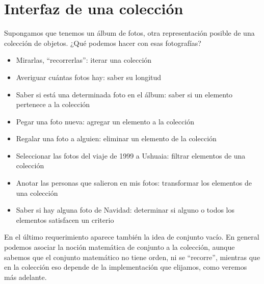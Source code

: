 \documentclass[a4paper,12pt]{book}
\begin{document}
\section{Interfaz de una colección}
Supongamos que tenemos un álbum de fotos, otra representación posible de una colección de objetos.
¿Qué podemos hacer con esas fotografías?
\\
\begin{itemize}
\item Mirarlas, ``recorrerlas'': iterar una colección
\item Averiguar cuántas fotos hay: saber su longitud
\item Saber si está una determinada foto en el álbum: saber si un elemento pertenece a la colección
\item Pegar una foto nueva: agregar un elemento a la colección
\item Regalar una foto a alguien: eliminar un elemento de la colección
\item Seleccionar las fotos del viaje de 1999 a Ushuaia: filtrar elementos de una colección
\item Anotar las personas que salieron en mis fotos: transformar los elementos de una colección
\item Saber si hay alguna foto de Navidad: determinar si alguno o todos los elementos satisfacen 
un criterio
\end{itemize}
En el último requerimiento aparece también la idea de conjunto vacío. 
En general podemos asociar la noción matemática de conjunto a la colección, aunque sabemos que el conjunto
matemático no tiene orden, ni se ``recorre'', mientras que en la colección eso depende de la implementación 
que elijamos, como veremos más adelante.
\\
\end{document}
